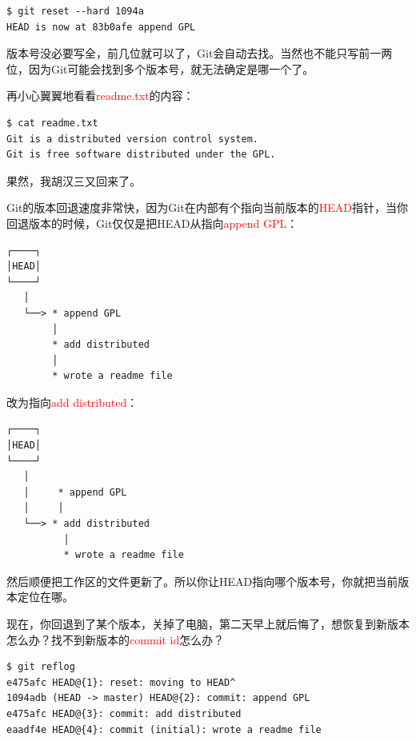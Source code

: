 \begin{verbatim}
$ git reset --hard 1094a
HEAD is now at 83b0afe append GPL
\end{verbatim}

版本号没必要写全，前几位就可以了，Git会自动去找。当然也不能只写前一两位，因为Git可能会找到多个版本号，就无法确定是哪一个了。

再小心翼翼地看看\textcolor{red}{readme.txt}的内容：

\begin{verbatim}
$ cat readme.txt
Git is a distributed version control system.
Git is free software distributed under the GPL.
\end{verbatim}

果然，我胡汉三又回来了。

Git的版本回退速度非常快，因为Git在内部有个指向当前版本的\textcolor{red}{HEAD}指针，当你回退版本的时候，Git仅仅是把HEAD从指向\textcolor{red}{append GPL}：

\begin{verbatim}
┌────┐
│HEAD│
└────┘
   │
   └──> * append GPL
        │
        * add distributed
        │
        * wrote a readme file
\end{verbatim}

改为指向\textcolor{red}{add distributed}：

\begin{verbatim}
┌────┐
│HEAD│
└────┘
   │
   │     * append GPL
   │     │
   └──> * add distributed
          │
          * wrote a readme file
\end{verbatim}

然后顺便把工作区的文件更新了。所以你让HEAD指向哪个版本号，你就把当前版本定位在哪。

现在，你回退到了某个版本，关掉了电脑，第二天早上就后悔了，想恢复到新版本怎么办？找不到新版本的\textcolor{red}{commit id}怎么办？


\begin{verbatim}
$ git reflog
e475afc HEAD@{1}: reset: moving to HEAD^
1094adb (HEAD -> master) HEAD@{2}: commit: append GPL
e475afc HEAD@{3}: commit: add distributed
eaadf4e HEAD@{4}: commit (initial): wrote a readme file
\end{verbatim}

